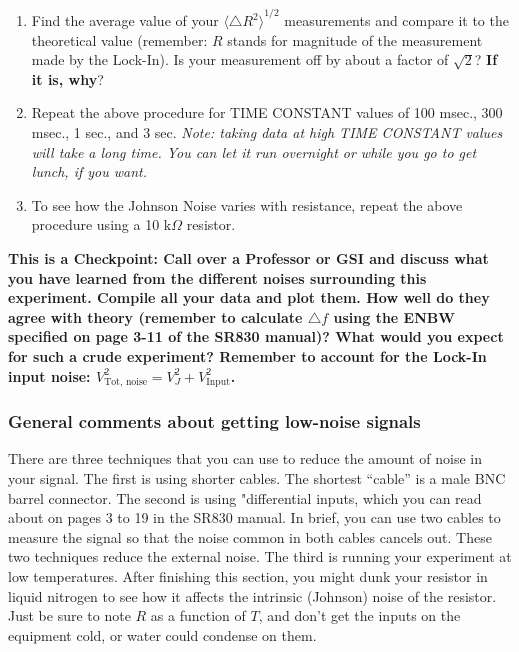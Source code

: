 \documentclass{../lab}
\begin{document}
\begin{enumerate}
    \item Find the average value of your ${\langle \triangle R^2 \rangle}^{1/2}$ measurements and compare it to the theoretical value (remember: $R$ stands for magnitude of the measurement made by the Lock-In). Is your measurement off by about a factor of $\sqrt{2}$? \textbf{If it is, why}?
    
    \item Repeat the above procedure for TIME CONSTANT values of 100 msec., 300 msec., 1 sec., and 3 sec. \emph{Note: taking data at high TIME CONSTANT values will take a long time. You can let it run overnight or while you go to get lunch, if you want.}
    
    \item To see how the Johnson Noise varies with resistance, repeat the above procedure using a 10 k$\Omega$ resistor.

\end{enumerate}

\textbf{This is a Checkpoint: Call over a Professor or GSI and discuss what you have learned from the different noises surrounding this experiment. Compile all your data and plot them.  How well do they agree with theory (remember to calculate $\triangle f$ using the ENBW specified on page 3-11 of the SR830 manual)? What would you expect for such a crude experiment? Remember to account for the Lock-In input noise: $V_\text{Tot, noise}^2 = V_J^2 + V_\text{Input}^2$.}

\subsubsection{General comments about getting low-noise signals}

There are three techniques that you can use to reduce the amount of noise in your signal. The first is using shorter cables. The shortest ``cable'' is a male BNC barrel connector. The second is using "differential inputs, which you can read about on pages 3 to 19 in the SR830 manual. In brief, you can use two cables to measure the signal so that the noise common in both cables cancels out. These two techniques reduce the external noise. The third is running your experiment at low temperatures. After finishing this section, you might dunk your resistor in liquid nitrogen to see how it affects the intrinsic (Johnson) noise of the resistor. Just be sure to note $R$ as a function of $T$, and don't get the inputs on the equipment cold, or water could condense on them.
\end{document}
